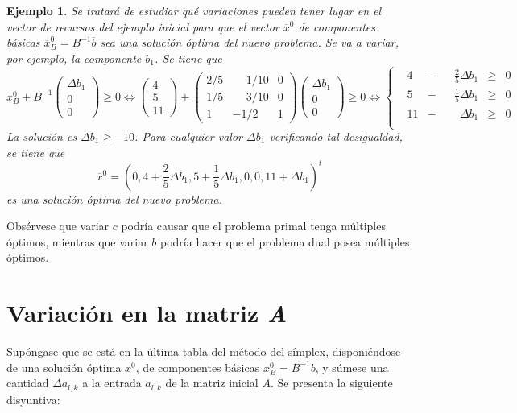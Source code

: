 \documentclass[11pt]{report}
\theoremstyle{mytheorem}
\theoremstyle{mydefinition}
\theoremstyle{myexample}
\newtheorem*{example}{Ejemplo}
\begin{document}
\begin{example}
Se tratará de estudiar qué variaciones pueden tener lugar en el vector de recursos del ejemplo inicial para que el vector $\overline{x}^0$ de componentes básicas $\overline{x}^0_B = B^{-1}\overline{b}$ sea una solución óptima del nuevo problema. Se va a variar, por ejemplo, la componente $b_1$. Se tiene que
\[x^0_B+B^{-1}\begin{pmatrix}
    \Delta b_1 \\
    0 \\
    0
\end{pmatrix} \geq 0 \iff \begin{pmatrix}
    4 \\
    5 \\
    11
\end{pmatrix}+\begin{pmatrix}
    2/5 & \phantom{-}1/10 & 0 \\
    1/5 & \phantom{-}3/10 & 0 \\
    1 & -1/2 & 1
\end{pmatrix}\begin{pmatrix}
    \Delta b_1 \\
    0 \\
    0
\end{pmatrix} \geq 0 \iff \left\{\begin{alignedat}{10}
& 4  & {}-{} & &\frac{2}{5}\Delta b_1  & {}\geq{} & 0 \\[4pt]
& 5  & {}-{} & &\frac{1}{5}\Delta b_1  & {}\geq{} & 0 \\[4pt]
& 11 & {}-{} & &\phantom{\frac{1}{1}}\Delta b_1 & {}\geq{} & 0 \\
\end{alignedat}\right.\]
La solución es $\Delta b_1 \geq -10$. Para cualquier valor $\Delta b_1$ verificando tal desigualdad, se tiene que 
\[\overline{x}^0 = (0,4+\frac{2}{5}\Delta b_1,5+\frac{1}{5}\Delta b_1,0,0,11+\Delta b_1)^t\]
es una solución óptima del nuevo problema.
\end{example}

Obsérvese que variar $c$ podría causar que el problema primal tenga múltiples óptimos, mientras que variar $b$ podría hacer que el problema dual posea múltiples óptimos.

\section{Variación en la matriz \textit{A}}

Supóngase que se está en la última tabla del método del símplex, disponiéndose de una solución óptima $x^0$, de componentes básicas $x^0_B = B^{-1}b$, y súmese una cantidad $\Delta a_{l,k}$ a la entrada $a_{l,k}$ de la matriz inicial $A$. Se presenta la siguiente disyuntiva:
\end{document}

